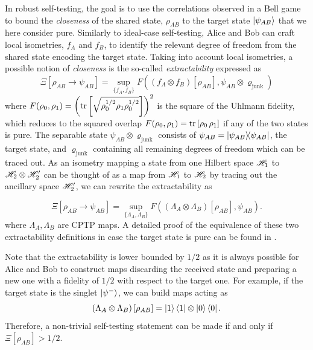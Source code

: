 In robust self-testing, the goal is to use the correlations observed in a Bell game to bound the \textit{closeness} of the shared state, $\rho_{AB}$ to the target state $\ket{\psi_{AB}}$ that we here consider pure.
Similarly to ideal-case self-testing, Alice and Bob can craft local isometries, $f_A$ and $f_B$, to identify the relevant degree of freedom from the shared state encoding the target state.
Taking into account local isometries, a possible notion of \textit{closeness} is the so-called \textit{extractability} expressed as
\begin{equation}
	\Xi [\rho_{AB} \rightarrow \psi_{AB}] = \sup_{\{f_A,f_B\}} F((f_A \otimes f_B)[\rho_{AB}],\psi_{AB} \otimes \varrho_\text{junk})
	\label{eq:extractability_junk}
\end{equation}
where $F(\rho_0,\rho_1) = \left(\trr{\sqrt{\rho_0^{1/2}\rho_1\rho_0^{1/2}}}\right)^2$ is the square of the Uhlmann fidelity, which reduces to the squared overlap $F(\rho_0,\rho_1)=\trr{\rho_0\,\rho_1}$ if any of the two states is pure.
The separable state $\psi_{AB} \otimes \varrho_\text{junk}$ consists of $\psi_{AB} = \ketbra{\psi_{AB}}$, the target state, and $\varrho_\text{junk}$ containing all remaining degrees of freedom which can be traced out.
As an isometry mapping a state from one Hilbert space $\mathscr{H}_1$ to $\mathscr{H}_2 \otimes \mathscr{H}_2'$ can be thought of as a map from $\mathscr{H}_1$ to $\mathscr{H}_2$ by tracing out the ancillary space $\mathscr{H}_2'$, we can rewrite the extractability as
 
\begin{equation}
	\Xi [\rho_{AB} \rightarrow \psi_{AB}] = \sup_{\{\Lambda_A,\Lambda_B\}} F((\Lambda_A \otimes \Lambda_B)[\rho_{AB}],\psi_{AB}).
	\label{eq:extractability}
\end{equation}
where $\Lambda_A,\Lambda_B$ are \acrfull{CPTP} maps. 
A detailed proof of the equivalence of these two extractability definitions in case the target state is pure can be found in \cite{Sekatski2018}.


Note that the extractability is lower bounded by $1/2$ as it is always possible for Alice and Bob to construct maps discarding the received state and preparing a new one with a fidelity of $1/2$ with respect to the target one. 
For example, if the target state is the singlet $\ket{\psi^{-}}$, we can build maps acting as
\begin{equation}	
	\left(\Lambda_A \otimes \Lambda_B\right)[\rho_{AB}] = \ket{1}\bra{1} \otimes \ket{0}\bra{0}.
\end{equation}
Therefore, a non-trivial self-testing statement can be made if and only if $\Xi[\rho_{AB}]>1/2$.


